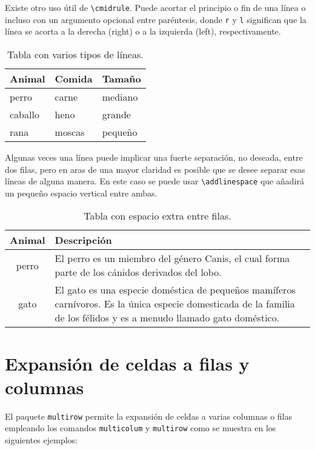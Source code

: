 \documentclass[11pt,a4paper]{article}
\begin{document}
Existe otro uso útil de \texttt{\textbackslash cmidrule}. Puede acortar el principio o fin de una línea o incluso con un argumento opcional entre paréntesis, donde \texttt{r} y \texttt{l} significan que la línea se acorta a la derecha (right) o a la izquierda (left), respectivamente.

\begin{table}[H]
   \centering
   	  \caption{Tabla con varios tipos de líneas.}
   	  \label{tab:cmidrule}      
    \begin{tabular}{lll}
      \toprule
      Animal  & Comida & Tamaño  \\
      \midrule
      perro   & carne  & mediano \\
      \cmidrule{1-2}
      caballo & heno   & grande  \\
      \cmidrule(r){1-1}
      \cmidrule(rl){2-2}
      \cmidrule(l){3-3}
      rana    & moscas & pequeño \\
      \bottomrule
    \end{tabular}
\end{table}

Algunas veces una línea puede implicar una fuerte separación, no deseada, entre dos filas, pero en aras de una mayor claridad es posible que se desee separar esas líneas de alguna manera. En este caso se puede usar \texttt{\textbackslash addlinespace} que añadirá un pequeño espacio vertical entre ambas.

\begin{table}[H]
   \centering
   	  \caption{Tabla con espacio extra entre filas.}
   	  \label{tab:espace}      
    \begin{tabular}{cp{9cm}}
      \toprule
      Animal & Descripción \\
      \midrule
      perro  & El perro es un miembro del género Canis, el cual forma parte 
               de los cánidos derivados del lobo. \\
      \addlinespace
      gato   & El gato es una especie doméstica de pequeños mamíferos carnívoros. Es la 
               única especie domesticada de la familia de los félidos y es a menudo llamado 
    		   gato doméstico. \\
      \bottomrule
    \end{tabular}
\end{table}






\section{Expansión de celdas a filas y columnas}
El paquete \texttt{multirow} permite la expansión de celdas a varias columnas o filas empleando los comandos \texttt{multicolum} y \texttt{multirow} como se muestra en los siguientes ejemplos:
\end{document}
